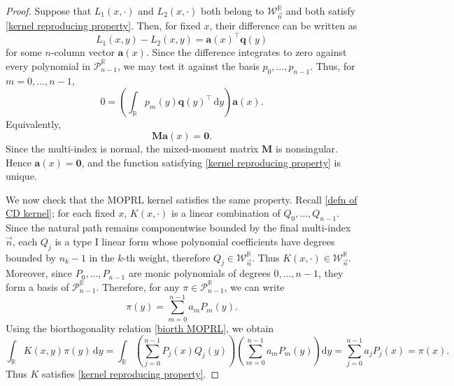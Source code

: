 \documentclass[a4paper,10pt,leqno]{amsart}
\numberwithin{equation}{section}
\theoremstyle{remark}
\newcommand{\dd}{\mathrm{d}}
\begin{document}
\begin{proof}
Suppose that $L_1(x,\cdot)$ and $L_2(x,\cdot)$ both belong to $\mathcal W_{\vec n}^{\mathbb R}$ and both satisfy \eqref{kernel reproducing property}. Then, for fixed $x$, their difference can be written as
\begin{equation}
    L_1(x,y)-L_2(x,y)=\bm a(x)^\top\bm q(y)
\end{equation}
for some $n$-column vector $\bm a(x)$. Since the difference integrates to zero against every polynomial in $\mathcal P_{n-1}^{\mathbb R}$, we may test it against the basis $p_0,\ldots,p_{n-1}$. Thus, for $m=0,\ldots,n-1$,
\begin{equation}
    0=\left(\int_{\mathbb R}p_m(y)\bm q(y)^\top\,\dd y\right)\bm a(x).
\end{equation}
Equivalently,
\begin{equation}
    \bm M\bm a(x)=\bm 0.
\end{equation}
Since the multi-index is normal, the mixed-moment matrix $\bm M$ is nonsingular. Hence $\bm a(x)=\bm 0$, and the function satisfying \eqref{kernel reproducing property} is unique.

We now check that the MOPRL kernel satisfies the same property. Recall \eqref{defn of CD kernel}; for each fixed $x$, $K(x,\cdot)$ is a linear combination of $Q_0,\ldots,Q_{n-1}$. Since the natural path remains componentwise bounded by the final multi-index $\vec n$, each $Q_j$ is a type I linear form whose polynomial coefficients have degrees bounded by $n_k-1$ in the $k$-th weight, therefore $Q_j\in\mathcal W_{\vec n}^{\mathbb R}$. Thus $K(x,\cdot)\in\mathcal W_{\vec n}^{\mathbb R}$. Moreover, since $P_0,\ldots,P_{n-1}$ are monic polynomials of degrees $0,\ldots,n-1$, they form a basis of $\mathcal P_{n-1}^{\mathbb R}$. Therefore, for any $\pi\in\mathcal P_{n-1}^{\mathbb R}$, we can write
\begin{equation}
    \pi(y)=\sum_{m=0}^{n-1}a_mP_m(y).
\end{equation}
Using the biorthogonality relation \eqref{biorth MOPRL}, we obtain
\begin{equation}
    \int_{\mathbb R}K(x,y)\pi(y)\,\dd y = \int_{\mathbb R} \left(\sum_{j=0}^{n-1}P_j(x)Q_j(y)\right)  \left(\sum_{m=0}^{n-1}a_mP_m(y)\right)\dd y
    =\sum_{j=0}^{n-1}a_jP_j(x)=\pi(x).
\end{equation}
Thus $K$ satisfies \eqref{kernel reproducing property}.


\end{proof}
\end{document}
